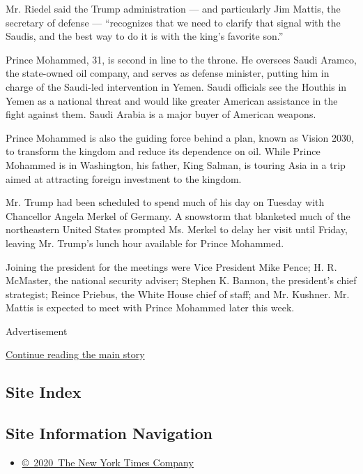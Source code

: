 Mr. Riedel said the Trump administration --- and particularly Jim
Mattis, the secretary of defense --- ``recognizes that we need to
clarify that signal with the Saudis, and the best way to do it is with
the king's favorite son.''

Prince Mohammed, 31, is second in line to the throne. He oversees Saudi
Aramco, the state-owned oil company, and serves as defense minister,
putting him in charge of the Saudi-led intervention in Yemen. Saudi
officials see the Houthis in Yemen as a national threat and would like
greater American assistance in the fight against them. Saudi Arabia is a
major buyer of American weapons.

Prince Mohammed is also the guiding force behind a plan, known as Vision
2030, to transform the kingdom and reduce its dependence on oil. While
Prince Mohammed is in Washington, his father, King Salman, is touring
Asia in a trip aimed at attracting foreign investment to the kingdom.

Mr. Trump had been scheduled to spend much of his day on Tuesday with
Chancellor Angela Merkel of Germany. A snowstorm that blanketed much of
the northeastern United States prompted Ms. Merkel to delay her visit
until Friday, leaving Mr. Trump's lunch hour available for Prince
Mohammed.

Joining the president for the meetings were Vice President Mike Pence;
H. R. McMaster, the national security adviser; Stephen K. Bannon, the
president's chief strategist; Reince Priebus, the White House chief of
staff; and Mr. Kushner. Mr. Mattis is expected to meet with Prince
Mohammed later this week.

Advertisement

\protect\hyperlink{after-bottom}{Continue reading the main story}

\hypertarget{site-index}{%
\subsection{Site Index}\label{site-index}}

\hypertarget{site-information-navigation}{%
\subsection{Site Information
Navigation}\label{site-information-navigation}}

\begin{itemize}
\tightlist
\item
  \href{https://help.nytimes3xbfgragh.onion/hc/en-us/articles/115014792127-Copyright-notice}{©~2020~The
  New York Times Company}
\end{itemize}

